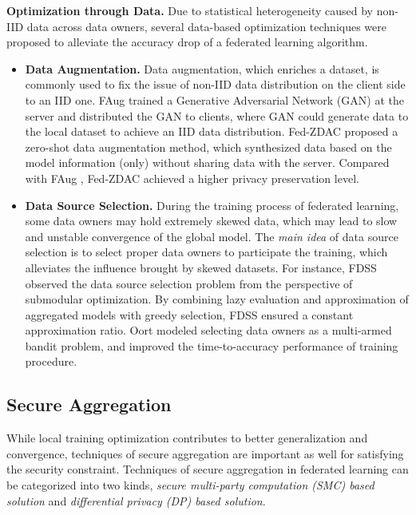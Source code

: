 \documentclass[11pt]{article}
\newcommand{\fakeparagraph}[1]{\vspace{1mm}\noindent\textbf{#1.}}
\begin{document}
\fakeparagraph{Optimization through Data}
Due to statistical heterogeneity caused by non-IID data across data owners, several data-based optimization techniques were proposed to alleviate the accuracy drop of a federated learning algorithm.
\begin{itemize}
    \item \textbf{Data Augmentation.}
    Data augmentation, which enriches a dataset, is commonly used to fix the issue of non-IID data distribution on the client side to an IID one.
    \textsf{FAug} \cite{DBLP:journals/corr/abs-1811-11479} trained a Generative Adversarial Network (GAN) at the server and distributed the GAN to clients, where GAN could generate data to the local dataset to achieve an IID data distribution.
    \textsf{Fed-ZDAC} \cite{DBLP:conf/cvpr/HaoELZLCC21} proposed a zero-shot data augmentation method, which synthesized data based on the model information (only) without sharing data with the server. 
	Compared with \textsf{FAug} \cite{DBLP:journals/corr/abs-1811-11479}, \textsf{Fed-ZDAC} \cite{DBLP:conf/cvpr/HaoELZLCC21} achieved a higher privacy preservation level.
	
    \item \textbf{Data Source Selection.}
    During the training process of federated learning, some data owners may hold extremely skewed data, which may lead to slow and unstable convergence of the global model. 
    The \textit{main idea} of data source selection is to select proper data owners to participate the training, which alleviates the influence brought by skewed datasets.
    For instance, \textsf{FDSS} \cite{DBLP:conf/dasfaa/ZhangWZRTX22} observed the data source selection problem from the perspective of submodular optimization. By combining lazy evaluation and approximation of aggregated models with greedy selection, \textsf{FDSS} ensured a constant approximation ratio.
    \textsf{Oort} \cite{DBLP:conf/osdi/LaiZMC21} modeled selecting data owners as a multi-armed bandit problem, and improved the time-to-accuracy performance of training procedure. 
\end{itemize}

\subsection{Secure Aggregation}\label{sec:learning-secure}
While local training optimization contributes to better generalization and convergence, techniques of secure aggregation are important as well for satisfying the security constraint.
Techniques of secure aggregation in federated learning can be categorized into two kinds, \textit{secure multi-party computation (SMC) based solution} and \textit{differential privacy (DP) based solution}.
\end{document}
